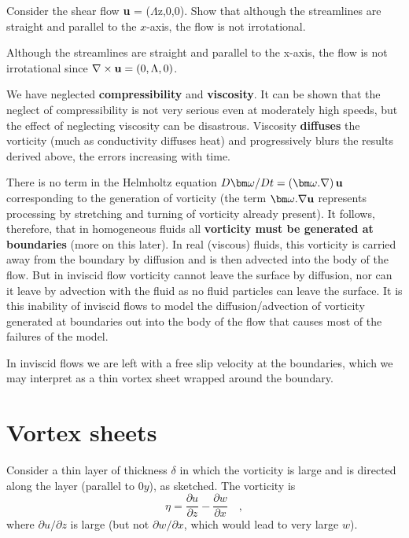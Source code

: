 \documentclass[10pt]{report}
\begin{document}
\begin{examplebox}
Consider the shear flow \textbf{u} = ($\Lambda $z,0,0). Show that although the
streamlines are straight and parallel to the $x$-axis, the flow is not
irrotational.

\begin{examplesolution4}
	Although the
	streamlines are straight and parallel to the x-axis, the flow is not
	irrotational since $\nabla \times {{\bf u}}=\left( {0,\Lambda ,0}
	\right)$.
\end{examplesolution4}

\end{examplebox}


We have neglected \textbf{compressibility} and \textbf{viscosity}. It can be
shown that the neglect of compressibility is not very serious even at
moderately high speeds, but the effect of neglecting viscosity can be
disastrous. Viscosity \textbf{diffuses} the vorticity (much as conductivity
diffuses heat) and progressively blurs the results derived above, the errors
increasing with time.

There is no term in the Helmholtz equation ${D{\bm\omega}}/{Dt}=\left( {{\bm\omega}. \nabla
} \right){{\bf u}}$ corresponding to the generation of vorticity (the
term ${\bm\omega}. \nabla {{\bf u}}$ represents processing by stretching and
turning of vorticity already present). It follows, therefore, that in
homogeneous fluids all \textbf{vorticity must be generated at boundaries
}(more on this later). In real (viscous) fluids, this vorticity is carried
away from the boundary by diffusion and is then advected into the body of
the flow. But in inviscid flow vorticity cannot leave the surface by
diffusion, nor can it leave by advection with the fluid as no fluid
particles can leave the surface. It is this inability of inviscid flows to
model the diffusion/advection of vorticity generated at boundaries out into
the body of the flow that causes most of the failures of the model.

In inviscid flows we are left with a free slip velocity at the boundaries,
which we may interpret as a thin vortex sheet wrapped around the boundary.

\section{Vortex sheets}
Consider a thin layer of thickness $\delta $ in which the vorticity is large
and is directed along the layer (parallel to $0y$), as sketched. The vorticity
is
\[
\eta =\frac{\partial u}{\partial z}-\frac{\partial w}{\partial x}\quad ,
\]
where $\partial u/\partial z$ is large (but not $\partial w/\partial x$,
which would lead to very large $w$).
\end{document}
